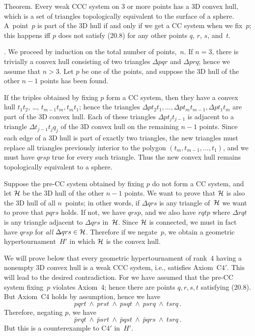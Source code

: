 \proclaim Theorem.
Every weak CCC system on 3 or more points has a 3D convex hull, which
is a set of triangles topologically equivalent to the surface of a
sphere. A~point\/~$p$ is part of the 3D hull if and only if we get a
CC system when we fix\/~$p$; this happens iff\/ $p$ does not satisfy
(20.8) for any other points\/ $q$, $r$, $s$, and\/~$t$.

.\quad
We proceed by induction on the total number of points,~$n$. If $n=3$,
there is trivially a convex hull consisting of two triangles $\Delta
pqr$ and $\Delta prq$; hence we assume that $n>3$. Let $p$ be one
of the points, and suppose the 3D hull of the other $n-1$ points has
been found.

If the triples obtained by fixing $p$ form a CC system, then they have
a convex hull $t_1t_2$, \dots, $t_{m-1}t_m,t_mt_1$; hence the triangles
$\Delta pt_2t_1,\ldots,\Delta pt_mt_{m-1},\Delta pt_1t_m$ are part of
the 3D convex hull. Each of these triangles $\Delta pt_jt_{j-1}$ is
adjacent to a triangle $\Delta t_{j-1}t_jq_j$ of the 3D convex hull
on the remaining $n-1$ points. Since each edge of a 3D hull is part
of exactly two triangles, the new triangles must replace all triangles
previously interior to the polygon $(t_m,t_{m-1},\ldots,t_1)$, and we
must have $qrsp$ true for every such triangle. Thus the new convex
hull remains topologically equivalent to a sphere.

Suppose the pre-CC system obtained by fixing $p$ do not form a CC
system, and let ${\cal H}$ be the 3D hull of the other $n-1$ points.
We want to prove that ${\cal H}$ is also the 3D hull of all
$n$~points; in other words, if $\Delta qrs$ is any triangle of~${\cal
H}$ we want to prove that $pqrs$ holds. If not, we have $qrsp$, and we
also have $rqtp$ where $\Delta rqt$ is any triangle adjacent to
$\Delta qrs$ in~${\cal H}$. Since ${\cal H}$ is connected, we must in
fact have $qrsp$ for {\it all\/} $\Delta qrs\in{\cal H}$. Therefore if
we negate~$p$, we obtain a geometric hypertournament~$H'$ in which
${\cal H}$ is the convex hull.

We will prove below that every geometric hypertournament of rank~4
having a nonempty 3D convex hull is a weak CCC system, i.e.,
satisfies Axiom~C$4'$. This will lead to the desired contradiction.
For we have assumed that the pre-CC system fixing~$p$ violates
Axiom~4; hence there are points $q,r,s,t$ satisfying (20.8). But
Axiom~C4 holds by assumption, hence we have
$$pqrt\ \wedge\  prst\ \wedge\  psqt\ \wedge\  psrq\ \wedge\  tsrq\,.$$
Therefore, negating $p$, we have 
$$\bar{p}rqt\ \wedge\ \bar{p}srt\ \wedge\ \bar{p}qst\ \wedge\ 
\bar{p}qrs\ \wedge\ tsrq\,.$$
But this is a counterexample to C$4'$ in~$H'$.

